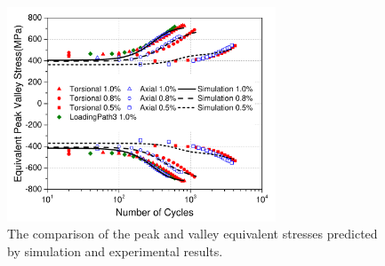 \documentclass[preprint,5p,twocolumn,10pt,sort&compress]{elsarticle}
\begin{document}
\begin{figure}[htbp]
  \begin{center}
  \includegraphics[width=8cm]{PeakValleyStress.pdf}
  \caption{The comparison of the peak and valley equivalent stresses predicted by simulation and experimental results.}
  \label{fig:Comparison of PeakValleyStress}
  \end{center}
\end{figure}
\end{document}
